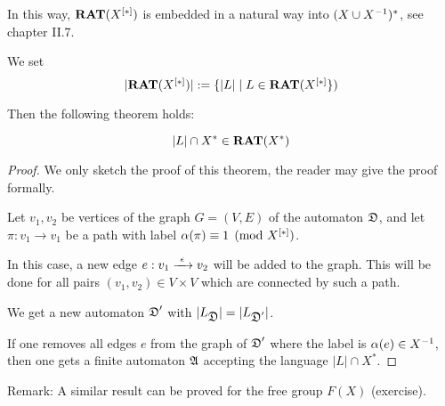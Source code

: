 In this way, $\mbox{{\bf RAT}}(\mbox{${X}^{[*]}$})$ is embedded in a natural way into
$(X \cup {X}^{-1})^*$, see chapter II.7.

We set
\[ |\mbox{{\bf RAT}}(\mbox{${X}^{[*]}$})| := \mbox{$\{|L| \mid L \in \mbox{{\bf RAT}}(\mbox{${X}^{[*]}$}\}$}) \]

Then the following theorem holds:

\begin{theorem}
\[ |L| \cap X^* \in \mbox{{\bf RAT}}(X^*) \]
\end{theorem}

\begin{proof}
We only sketch the proof of this theorem, the reader may give the proof
formally.

Let $v_1, v_2$ be vertices of the graph $G = (V, E)$ of the automaton $\mbox{$\mathfrak{D}$}$,
and let $\pi: v_1 \to v_1$ be a path with label $\alpha(\pi) \equiv 1
\pmod{\mbox{${X}^{[*]}$}}$.

In this case, a new edge $e: v_1 \xrightarrow{\ {\epsilon}\ } v_2$ will be added to the
graph. This will be done for all pairs $(v_1, v_2) \in V \times V$ which are
connected by such a path.

We get a new automaton $\mbox{$\mathfrak{D}$}'$ with $|L_{\mbox{$\mathfrak{D}$}}| = |L_{\mbox{$\mathfrak{D}$}'}|$.

If one removes all edges $e$ from the graph of $\mbox{$\mathfrak{D}$}'$ where the label is
$\alpha(e) \in {{X}^{-1}}$, then one gets a finite automaton $\mbox{$\mathfrak{A}$}$ accepting the
language $|L| \cap X^*$.
\end{proof}

Remark: A similar result can be proved for the free group $F(X)$
(exercise).


































